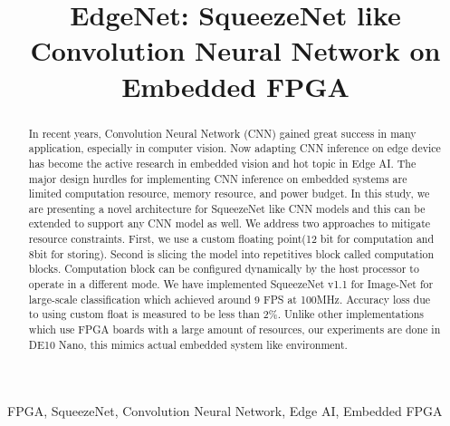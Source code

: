 \documentclass[conference]{IEEEtran}
\begin{document}
\title{EdgeNet: SqueezeNet like Convolution Neural Network on Embedded FPGA\\
}

\author{
\and
{}
\and
{}

}

\maketitle

\begin{abstract}
In recent years, Convolution Neural Network (CNN) gained great success in many application, especially in computer vision. Now adapting CNN inference on edge device has become the active research in embedded vision and hot topic in Edge AI. The major design hurdles for implementing CNN inference on embedded systems are limited computation resource, memory resource, and power budget. In this study, we are presenting a novel architecture for SqueezeNet\cite{squeezenet} like CNN models and this can be extended to support any CNN model as well. We address two approaches to mitigate resource constraints. First, we use a custom floating point(12 bit for computation and 8bit for storing). Second is slicing the model into repetitives block called computation blocks. Computation block can be configured dynamically by the host processor to operate in a different mode. We have implemented SqueezeNet v1.1 for Image-Net\cite{imagenet} for large-scale classification which achieved around 9 FPS at 100MHz. Accuracy loss due to using custom float is measured to be less than 2\%. Unlike other implementations which use FPGA boards with a large amount of resources, our experiments are done in DE10 Nano, this mimics actual embedded system like environment.

\end{abstract}

\begin{IEEEkeywords}
FPGA, SqueezeNet, Convolution Neural Network,  Edge AI,  Embedded FPGA
\end{IEEEkeywords}
\end{document}
